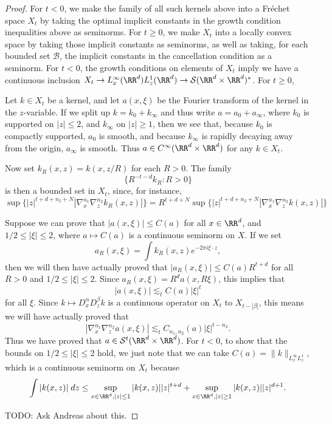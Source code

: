 \begin{proof}
    For $t < 0$, we make the family of all such kernels above into a Fr\'{e}chet space $X_t$ by taking the optimal implicit constants in the growth condition inequalities above as seminorms. For $t \geq 0$, we make $X_t$ into a locally convex space by taking those implicit constants as seminorms, as well as taking, for each bounded set $\mathcal{B}$, the implicit constants in the cancellation condition as a seminorm. For $t < 0$, the growth conditions on elements of $X_t$ imply we have a continuous inclusion $X_t \to L^\infty_x(\RR^d) L^1_z(\RR^d) \to \mathcal{S}(\RR^d \times \RR^d)^*$. For $t \geq 0$,

    Let $k \in X_t$ be a kernel, and let $a(x,\xi)$ be the Fourier transform of the kernel in the $z$-variable. If we split up $k = k_0 + k_\infty$ and thus write $a = a_0 + a_\infty$, where $k_0$ is supported on $|z| \leq 2$, and $k_\infty$ on $|z| \geq 1$, then we see that, because $k_0$ is compactly supported, $a_0$ is smooth, and because $k_\infty$ is rapidly decaying away from the origin, $a_\infty$ is smooth. Thus $a \in C^\infty(\RR^d \times \RR^d)$ for any $k \in X_t$.

    Now set $k_R(x,z) = k(x,z/R)$ for each $R > 0$. The family
    \[ \{ R^{-t-d} k_R : R > 0 \} \]
    is then a bounded set in $X_t$, since, for instance,
    \[ \sup \{ |z|^{t+d+n_2+N} |\nabla_x^{n_1} \nabla_z^{n_2} k_R(x,z)| \} = R^{t + d + N} \sup \{ |z|^{t + d + n_2 + N} |\nabla_x^{n_1} \nabla_z^{n_2} k(x,z)| \} \]


    Suppose we can prove that $|a(x,\xi)| \leq C(a)$ for all $x \in \RR^d$, and $1/2 \leq |\xi| \leq 2$, where $a \mapsto C(a)$ is a continuous seminorm on $X$. If we set
    \[ a_R(x,\xi) = \int k_R(x,z) e^{-2 \pi i \xi \cdot z}, \]
    then we will then have actually proved that $|a_R(x,\xi)| \leq C(a) R^{t+d}$ for all $R > 0$ and $1/2 \leq |\xi| \leq 2$. Since $a_R(x,\xi) = R^d a(x,R \xi)$, this implies that
    \[ |a(x,\xi)| \lesssim_t C(a) |\xi|^t \]
    for all $\xi$. Since $k \mapsto D^\alpha_x D^\beta_z k$ is a continuous operator on $X_t$ to $X_{t - |\beta|}$, this means we will have actually proved that
    \[ |\nabla^{n_1}_x \nabla^{n_2}_z a(x,\xi)| \lesssim_t C_{n_1,n_2}(a) |\xi|^{t-n_2}. \]
    Thus we have proved that $a \in \mathcal{S}^t(\RR^d \times \RR^d)$. For $t < 0$, to show that the bounds on $1/2 \leq |\xi| \leq 2$ hold, we just note that we can take $C(a) = \| k \|_{L^\infty_x L^1_z}$, which is a continuous seminorm on $X_t$ because
    \[ \int |k(x,z)|\; dz \leq \sup_{x \in \RR^d, |z| \leq 1} |k(x,z)| |z|^{t + d} + \sup_{x \in \RR^d, |z| \geq 1} |k(x,z)| |z|^{d+1}. \]

    TODO: Ask Andreas about this.
\end{proof}

